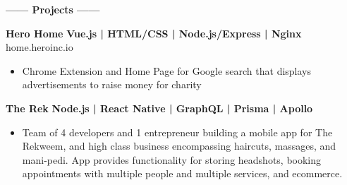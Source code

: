 \documentclass[12pt]{article}
\begin{document}
\colorbox{secondary}{
    \parbox{45em}{
    \color{white}
    \vspace{-2mm}

    \begin{center}
    \textbf{\Large------ Projects ------}\\
    \end{center}
    
    \vspace{-5mm}
    \begin{footnotesize}

    \textbf{\color{primary}\large Hero Home } \hfill \textbf{\color{Cerulean}Vue.js | HTML/CSS | Node.js/Express | Nginx }\\
    {\color{primary}\footnotesize home.heroinc.io}
    \begin{itemize}
        \item Chrome Extension and Home Page for Google search that displays advertisements to raise money for charity
    \end{itemize}


    \flushleft

    \textbf{\color{primary}\large The Rek} \hfill \textbf{\color{Cerulean} Node.js | React Native | GraphQL | Prisma | Apollo}
    \begin{itemize}
        \item Team of 4 developers and 1 entrepreneur building a mobile app for The Rekweem, and high class business encompassing haircuts, massages, and mani-pedi. App provides functionality for storing headshots, booking appointments with multiple people and multiple services, and ecommerce.
    \end{itemize}

    \end{footnotesize}
}}

\end{document}
